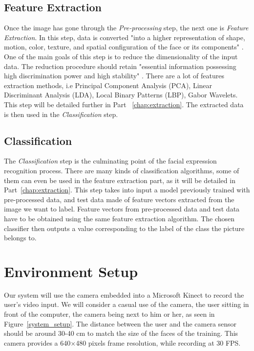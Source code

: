 \subsection{Feature Extraction}

\vspace{\baselineskip}
\noindent Once the image has gone through the \textit{Pre-processing} step, the next one is \textit{Feature Extraction}. In this step, data is converted "into a higher representation of shape, motion, color, texture, and spatial configuration of the face or its components" \cite{CHI03}. One of the main goals of this step is to reduce the dimensionality of the input data. The reduction procedure should retain "essential information possessing high discrimination power and high stability" \cite{CHI03}. There are a lot of features extraction methods, i.e Principal Component Analysis (PCA), Linear Discriminant Analysis (LDA), Local Binary Patterns (LBP), Gabor Wavelets. This step will be detailed further in Part ~\ref{chap:extraction}. The extracted data is then used in the \textit{Classification} step.
\newline

\subsection{Classification}

\noindent The \textit{Classification} step is the culminating point of the facial expression recognition process. There are many kinds of classification algorithms, some of them can even be used in the feature extraction part, as it will be detailed in Part~\ref{chap:extraction}. This step takes into input a model previously trained with pre-processed data, and test data made of feature vectors extracted from the image we want to label. Feature vectors from pre-processed data and test data have to be obtained using the same feature extraction algorithm. The chosen classifier then outputs a value corresponding to the label of the class the picture belongs to.

\section{Environment Setup}

\vspace{\baselineskip}
\noindent Our system will use the camera embedded into a Microsoft Kinect to record the user's video input. We will consider a casual use of the camera, the user sitting in front of the computer, the camera being next to him or her, as seen in Figure~\ref{system_setup}. The distance between the user and the camera sensor should be around 30-40 cm to match the size of the faces of the training. This camera provides a 640$\times$480 pixels frame resolution, while recording at 30 FPS.
\newline

